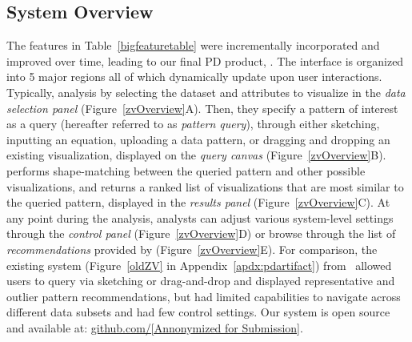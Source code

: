  \subsection{System Overview\label{sec:system}}%
 The features in Table~\ref{bigfeaturetable} were incrementally incorporated and improved over time, leading to our final PD product, \zvpp.  The \zvpp interface is organized into 5 major regions all of which dynamically update upon user interactions. Typically,  analysis by selecting the dataset and attributes to visualize in the \emph{data selection panel} (Figure~\ref{zvOverview}A). Then, they specify a pattern of interest as a query (hereafter referred to as \emph{pattern query}), through either sketching, inputting an equation, uploading a data pattern, or dragging and dropping an existing visualization, displayed on the \emph{query canvas} (Figure~\ref{zvOverview}B). \zvpp performs shape-matching between the queried pattern and other possible visualizations, and returns a ranked list of visualizations that are most similar to the queried pattern, displayed in the \emph{results panel} (Figure~\ref{zvOverview}C). At any point during the analysis, analysts can adjust various system-level settings through the \emph{control panel} (Figure~\ref{zvOverview}D) or browse through the list of \emph{recommendations} provided by \zvpp (Figure~\ref{zvOverview}E). For comparison, the existing \zv system (Figure~\ref{oldZV} in Appendix~\ref{apdx:pdartifact}) from~\cite{Siddiqui2017} allowed users to query via sketching or drag-and-drop and displayed representative and outlier pattern recommendations, but had limited capabilities to navigate across different data subsets and had few control settings. Our \zvpp system is open source and available at: \url{github.com/[Annonymized for Submission]}. %
 